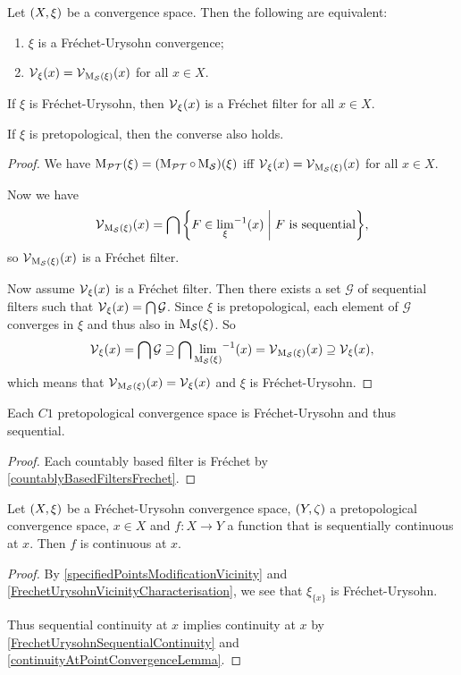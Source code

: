 \begin{proposition} \label{FrechetUrysohnVicinityCharacterisation}
Let $\sSet{X,\xi}$ be a convergence space. Then the following are equivalent:
\begin{enumerate}
\item $\xi$ is a Fréchet-Urysohn convergence;
\item $\operatorname{\mathcal{V}}_\xi(x) = \operatorname{\mathcal{V}}_{\operatorname{M_\mathcal{S}}(\xi)}(x)$ for all $x\in X$.
\end{enumerate}
If $\xi$ is Fréchet-Urysohn, then $\operatorname{\mathcal{V}}_\xi(x)$ is a Fréchet filter for all $x\in X$.

If $\xi$ is pretopological, then the converse also holds.
\end{proposition}
\begin{proof}
We have $\operatorname{M_\mathcal{PT}}(\xi) = (\operatorname{M_\mathcal{PT}}\circ \operatorname{M_\mathcal{S}})(\xi)$ iff $\operatorname{\mathcal{V}}_\xi(x) = \operatorname{\mathcal{V}}_{\operatorname{M_\mathcal{S}}(\xi)}(x)$ for all $x\in X$.

Now we have
\[ \vicinities_{\seqMod(\xi)}(x) = \bigcap\setbuilder{F\in {\lim_{\xi}}^{-1}(x)}{\text{$F$ is sequential}}, \]
so $\operatorname{\mathcal{V}}_{\operatorname{M_\mathcal{S}}(\xi)}(x)$ is a Fréchet filter.

Now assume $\operatorname{\mathcal{V}}_\xi(x)$ is a Fréchet filter. Then there exists a set $\mathcal{G}$ of sequential filters such that $\operatorname{\mathcal{V}}_\xi(x) = \bigcap \mathcal{G}$. Since $\xi$ is pretopological, each element of $\mathcal{G}$ converges in $\xi$ and thus also in $\operatorname{M_\mathcal{S}}(\xi)$. So
\[ \operatorname{\mathcal{V}}_\xi(x) = \bigcap \mathcal{G} \supseteq \bigcap {\lim_{\operatorname{M_\mathcal{S}}(\xi)}}^{-1}(x) = \operatorname{\mathcal{V}}_{\operatorname{M_\mathcal{S}}(\xi)}(x) \supseteq \operatorname{\mathcal{V}}_{\xi}(x), \]
which means that $\operatorname{\mathcal{V}}_{\operatorname{M_\mathcal{S}}(\xi)}(x) = \operatorname{\mathcal{V}}_{\xi}(x)$ and $\xi$ is Fréchet-Urysohn.
\end{proof}
\begin{corollary} \label{C1ImpliesFrechetUrysohn}
Each $C1$ pretopological convergence space is Fréchet-Urysohn and thus sequential.
\end{corollary}
\begin{proof}
Each countably based filter is Fréchet by \ref{countablyBasedFiltersFrechet}.
\end{proof}

\begin{lemma} \label{FrechetUrysohnSequentialContinuityAtAPoint}
Let $\sSet{X,\xi}$ be a Fréchet-Urysohn convergence space, $\sSet{Y,\zeta}$ a pretopological convergence space, $x\in X$ and $f: X\to Y$ a function that is sequentially continuous at $x$. Then $f$ is continuous at $x$.
\end{lemma}
\begin{proof}
By \ref{specifiedPointsModificationVicinity} and \ref{FrechetUrysohnVicinityCharacterisation}, we see that $\xi_{\{x\}}$ is Fréchet-Urysohn.

Thus sequential continuity at $x$ implies continuity at $x$ by \ref{FrechetUrysohnSequentialContinuity} and \ref{continuityAtPointConvergenceLemma}.
\end{proof}

